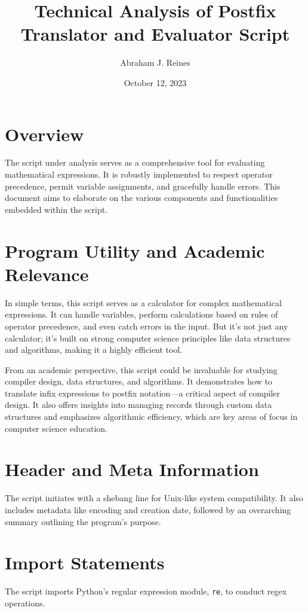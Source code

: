 \documentclass[12pt]{article}
\title{Technical Analysis of Postfix Translator and Evaluator Script}
\author{Abraham J. Reines}
\date{October 12, 2023}
\begin{document}
\maketitle
\newpage

\section{Overview}
The script under analysis serves as a comprehensive tool for evaluating mathematical expressions. 
It is robustly implemented to respect operator precedence, permit variable assignments, and gracefully handle errors. 
This document aims to elaborate on the various components and functionalities embedded within the script.

\section{Program Utility and Academic Relevance}
In simple terms, this script serves as a calculator for complex mathematical expressions. It can handle variables, perform calculations based on rules of operator precedence, and even catch errors in the input. But it's not just any calculator; it's built on strong computer science principles like data structures and algorithms, making it a highly efficient tool.

From an academic perspective, this script could be invaluable for studying compiler design, data structures, and algorithms. It demonstrates how to translate infix expressions to postfix notation—a critical aspect of compiler design. It also offers insights into managing records through custom data structures and emphasizes algorithmic efficiency, which are key areas of focus in computer science education.

\section{Header and Meta Information}
The script initiates with a shebang line for Unix-like system compatibility. 
It also includes metadata like encoding and creation date, followed by an overarching summary outlining the program's purpose.

\section{Import Statements}
The script imports Python's regular expression module, \texttt{re}, to conduct regex operations.
\end{document}
